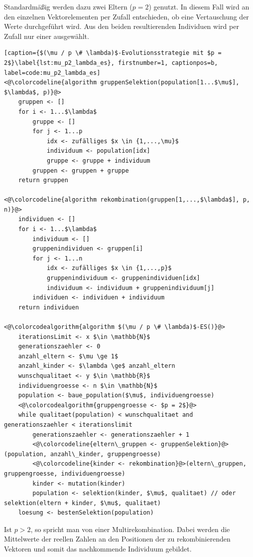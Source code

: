 Standardmäßig werden dazu zwei Eltern ($p = 2$) genutzt.
In diesem Fall wird an den einzelnen Vektorelementen per Zufall entschieden, ob eine Vertauschung der Werte durchgeführt wird.
Aus den beiden resultierenden Individuen wird per Zufall nur einer ausgewählt.

\begin{lstlisting}[caption={$(\mu / p \# \lambda)$-Evolutionsstrategie mit $p = 2$}\label{lst:mu_p2_lambda_es}, firstnumber=1, captionpos=b, label=code:mu_p2_lambda_es]
<@\colorcodeline{algorithm gruppenSelektion(population[1...$\mu$], $\lambda$, p)}@>
	gruppen <- []
	for i <- 1...$\lambda$
		gruppe <- []
		for j <- 1...p
			idx <- zufälliges $x \in {1,...,\mu}$
			individuum <- population[idx]
			gruppe <- gruppe + individuum
		gruppen <- gruppen + gruppe
	return gruppen

<@\colorcodeline{algorithm rekombination(gruppen[1,...,$\lambda$], p, n)}@>
	individuen <- []
	for i <- 1...$\lambda$
		individuum <- []
		gruppenindividuen <- gruppen[i]
		for j <- 1...n
			idx <- zufälliges $x \in {1,...,p}$
			gruppenindividuum <- gruppenindividuen[idx]
			individuum <- individuum + gruppenindividuum[j]
		individuen <- individuen + individuum
	return individuen

<@\colorcodealgorithm{algorithm $(\mu / p \# \lambda)$-ES()}@>
	iterationsLimit <- x $\in \mathbb{N}$
	generationszaehler <- 0
	anzahl_eltern <- $\mu \ge 1$
	anzahl_kinder <- $\lambda \ge$ anzahl_eltern
	wunschqualitaet <- y $\in \mathbb{R}$
	individuengroesse <- n $\in \mathbb{N}$
	population <- baue_population($\mu$, individuengroesse)
	<@\colorcodealgorithm{gruppengroesse <- $p = 2$}@>
	while qualitaet(population) < wunschqualitaet and generationszaehler < iterationslimit
		generationszaehler <- generationszaehler + 1
		<@\colorcodeline{eltern\_gruppen <- gruppenSelektion}@>(population, anzahl\_kinder, gruppengroesse)
		<@\colorcodeline{kinder <- rekombination}@>(eltern\_gruppen, gruppengroesse, individuengroesse)
		kinder <- mutation(kinder)
		population <- selektion(kinder, $\mu$, qualitaet) // oder selektion(eltern + kinder, $\mu$, qualitaet)
	loesung <- bestenSelektion(population)
\end{lstlisting}


Ist $p > 2$, so spricht man von einer Multirekombination.
Dabei werden die Mittelwerte der reellen Zahlen an den Positionen der zu rekombinierenden Vektoren und somit das nachkommende Individuum gebildet.

